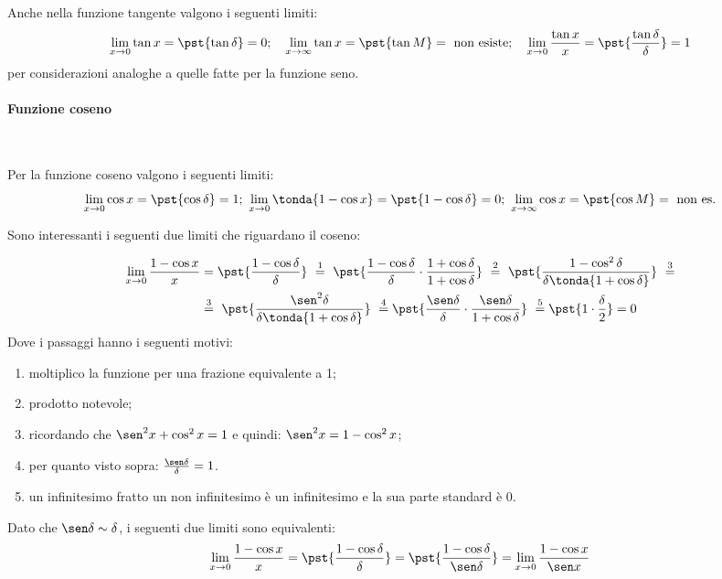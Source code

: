 Anche nella funzione tangente valgono i seguenti limiti:
\[\lim_{x \rightarrow 0}{\tan x} = \pst{\tan \delta} = 0; \quad
\lim_{x \rightarrow \infty}{\tan x} = \pst{\tan M} = 
                                      \text{ non esiste}; \quad
\lim_{x \rightarrow 0}\frac{\tan x}{x} = \pst{\frac{\tan \delta}{\delta}} 
                                       = 1\]
per considerazioni analoghe a quelle fatte per la funzione seno.

\paragraph{Funzione coseno}~

Per la funzione coseno valgono i seguenti limiti:
\[\lim_{x \rightarrow 0}{\cos x} = \pst{\cos \delta} = 1; ~
\lim_{x \rightarrow 0}\tonda{1-\cos x} = \pst{1-\cos \delta} = 0; ~
\lim_{x \rightarrow \infty}{\cos x} = \pst{\cos M} = \text{ non es.}\]

Sono interessanti i seguenti due limiti che riguardano il coseno:

\begin{align*}
 \lim_{x \rightarrow 0} \frac{1-\cos x}{x} &=
 \pst{\frac{1-\cos \delta}{\delta}}
~ \stackrel{1}{=} ~  
 \pst{\frac{1-\cos \delta}{\delta} \cdot 
      \frac{1+\cos \delta}{1+\cos \delta}}
~ \stackrel{2}{=} ~ 
 \pst{\frac{1-\cos^2 \delta}{\delta \tonda{1+\cos \delta}}}~ 
\stackrel{3}{=} \\
& \stackrel{3}{=} ~
 \pst{\frac{\sen^2 \delta}{\delta \tonda{1+\cos \delta}}}
~ \stackrel{4}{=}
 \pst{\frac{\sen \delta}{\delta} \cdot 
      \frac{\sen \delta}{1+\cos \delta}}
~ \stackrel{5}{=}
 \pst{1 \cdot \frac{\delta}{2}} = 0
\end{align*}
Dove i passaggi hanno i seguenti motivi:
\begin{enumerate} [nosep]
 \item moltiplico la funzione per una frazione equivalente a 1;
 \item prodotto notevole;
 \item ricordando che \(\sen^2 x + \cos^2 x = 1\) e quindi: 
 \(\sen^2 x = 1 - \cos^2 x\);
 \item per quanto visto sopra: \(\frac{\sen \delta}{\delta} = 1\).
 \item un infinitesimo fratto un non infinitesimo è un infinitesimo 
e la sua parte standard è 0.
\end{enumerate}

\begin{osservazione}
Dato che \(\sen \delta \sim \delta\), i seguenti due limiti sono 
equivalenti:
\[\lim_{x \rightarrow 0} \frac{1-\cos x}{x} =
 \pst{\frac{1-\cos \delta}{\delta}} =
 \pst{\frac{1-\cos \delta}{\sen \delta}} =
 \lim_{x \rightarrow 0} \frac{1-\cos x}{\sen x}\]
\end{osservazione}

